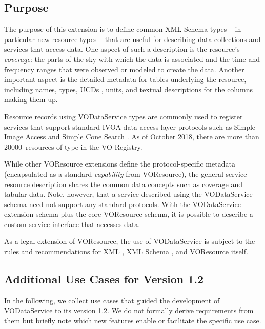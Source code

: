 \documentclass[11pt,a4paper]{ivoa}
\begin{document}
\subsection{Purpose}


The purpose of this extension is to define common XML Schema
types -- in particular new resource types -- that are useful for describing
data collections and services that access data.  One aspect of such a
description is the resource's \emph{coverage}:  the parts of the
sky with which the data is associated and the time and frequency ranges that
were observed or modeled to create the data.  Another important aspect
is the detailed metadata for tables underlying the resource, including
names, types, UCDs
\citep{2005ivoa.spec.1231D}, units,
and textual descriptions for the columns making them up.  

Resource records using VODataService types are commonly used to register
services that support standard IVOA data access layer protocols such
as Simple Image Access \citep{2015ivoa.spec.1223D} and Simple Cone Search
\citep{2008ivoa.specQ0222P}.  As of October 2018, there are more than
20000~resources of type  in the VO Registry.

While other VOResource extensions 
define the protocol-specific metadata (encapsulated as a standard
\emph{capability} from VOResource), the general service
resource description shares the common data concepts such as
coverage and tabular data.  Note, however, that a service described
using the VODataService schema need not support any standard
protocols.  With the VODataService extension schema plus the core
VOResource schema, it is possible to describe a custom service
interface that accesses data.  



As a legal extension of VOResource, the use
of VODataService is subject to the rules and recommendations for XML
\citep{std:XML}, XML Schema \citep{std:XSD},
and VOResource itself.  

\subsection{Additional Use Cases for Version 1.2}

In the following, we collect use cases that guided the development of
VODataService to its version 1.2.  We do not formally derive
requirements from them but briefly note which new features enable or
facilitate the specific use case.
\end{document}
